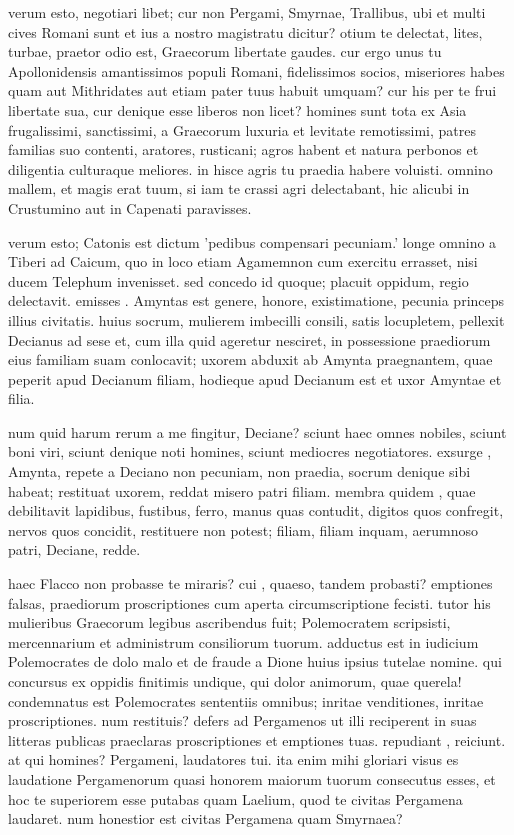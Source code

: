  verum esto, negotiari libet; cur non Pergami, Smyrnae, Trallibus, ubi et multi cives Romani sunt et ius a nostro magistratu dicitur? otium te delectat, lites, turbae, praetor odio est, Graecorum libertate gaudes. cur ergo unus tu Apollonidensis amantissimos populi Romani, fidelissimos socios, miseriores habes quam aut Mithridates aut etiam pater tuus habuit umquam? cur his per te frui libertate sua, cur denique esse liberos non licet? homines sunt tota ex Asia frugalissimi, sanctissimi, a Graecorum luxuria et levitate remotissimi, patres familias suo contenti, aratores, rusticani; agros habent et natura perbonos et diligentia culturaque meliores. in hisce agris tu praedia habere voluisti. omnino mallem, et magis erat tuum, si iam te crassi agri delectabant, hic alicubi in Crustumino aut in Capenati paravisses.

 verum esto; Catonis est dictum 'pedibus compensari pecuniam.' longe omnino a Tiberi ad Caicum, quo in loco etiam Agamemnon cum exercitu errasset, nisi ducem Telephum invenisset. sed concedo id quoque; placuit oppidum, regio delectavit. emisses . Amyntas est genere, honore, existimatione, pecunia princeps illius civitatis. huius socrum, mulierem imbecilli consili, satis locupletem, pellexit Decianus ad sese et, cum illa quid ageretur nesciret, in possessione praediorum eius familiam suam conlocavit; uxorem abduxit ab Amynta praegnantem, quae peperit apud Decianum filiam, hodieque apud Decianum est et uxor Amyntae et filia.

 num quid harum rerum a me fingitur, Deciane? sciunt haec omnes nobiles, sciunt boni viri, sciunt denique noti homines, sciunt mediocres negotiatores. exsurge , Amynta, repete a Deciano non pecuniam, non praedia, socrum denique sibi habeat; restituat uxorem, reddat misero patri filiam. membra quidem , quae debilitavit lapidibus, fustibus, ferro, manus quas contudit, digitos quos confregit, nervos quos concidit, restituere non potest; filiam, filiam inquam, aerumnoso patri, Deciane, redde.

 haec Flacco non probasse te miraris? cui , quaeso, tandem probasti? emptiones falsas, praediorum proscriptiones cum aperta circumscriptione fecisti. tutor his mulieribus Graecorum legibus ascribendus fuit; Polemocratem scripsisti, mercennarium et administrum consiliorum tuorum. adductus est in iudicium Polemocrates de dolo malo et de fraude a Dione huius ipsius tutelae nomine. qui concursus ex oppidis finitimis undique, qui dolor animorum, quae querela! condemnatus est Polemocrates sententiis omnibus; inritae venditiones, inritae proscriptiones. num restituis? defers ad Pergamenos ut illi reciperent in suas litteras publicas praeclaras proscriptiones et emptiones tuas. repudiant , reiciunt. at qui homines? Pergameni, laudatores tui. ita enim mihi gloriari visus es laudatione Pergamenorum quasi honorem maiorum tuorum consecutus esses, et hoc te superiorem esse putabas quam Laelium, quod te civitas Pergamena laudaret. num honestior est civitas Pergamena quam Smyrnaea?

